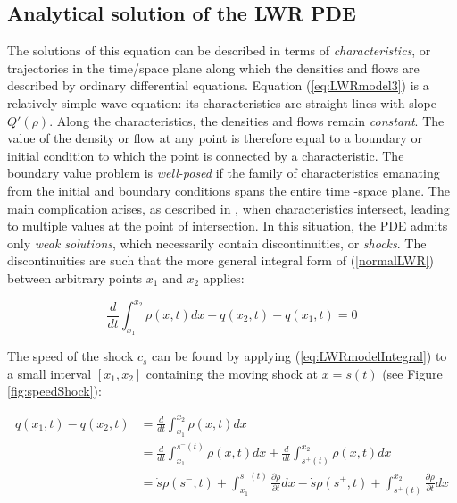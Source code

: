 \documentclass[letterpaper,10pt]{article}
\begin{document}
\subsection{Analytical solution of the LWR PDE}\label{characteristics}

The solutions of this equation can be described in terms of \textit{characteristics}, or trajectories in the time/space plane along which the densities and flows are described by ordinary differential equations. Equation (\ref{eq:LWRmodel3}) is a relatively simple wave equation: its characteristics are straight lines with slope $Q'(\rho)$. Along the characteristics, the densities and flows remain \textit{constant}. The value of the density or flow at any point is therefore equal to a boundary or initial condition to which the point is connected by a characteristic. The boundary value problem is \textit{well-posed} if the family of characteristics emanating from the initial and boundary conditions spans the entire time -space plane. The main complication arises, as described in \cite{Lighthill1955}, when characteristics intersect, leading to multiple values at the point of intersection. In this situation, the PDE admits only \textit{weak solutions}, which necessarily contain discontinuities, or \textit{shocks}. The discontinuities are such that the more general integral form of (\ref{normalLWR}) between arbitrary points $x_{1}$ and $x_{2}$ applies:

\begin{equation} \label{eq:LWRmodelIntegral}
\frac{d}{dt} \int_{x_{1}}^{x_{2}} \rho(x,t)dx + q(x_{2},t) - q(x_{1},t) = 0
\end{equation}

The speed of the shock $c_{s}$ can be found by applying (\ref{eq:LWRmodelIntegral}) to a small interval $[x_{1},x_{2}]$ containing the moving shock at $x=s(t)$ \cite{Whitham1999} (see Figure \ref{fig:speedShock}):

\begin{equation} \label{eq:csCalculus}
\begin{split}
q(x_{1},t) - q(x_{2},t) & = \frac{d}{dt}\int_{x_{1}}^{x_{2}} \rho(x,t)dx\\
& = \frac{d}{dt}\int_{x_{1}}^{s^{-}(t)}\rho(x,t)dx + \frac{d}{dt}\int_{s^{+}(t)}^{x_{2}}\rho(x,t)dx\\
& = \dot{s} \rho(s^{-},t) + \int_{x_{1}}^{s^{-}(t)}\frac{\partial \rho}{\partial t}dx - \dot{s} \rho(s^{+},t) + \int_{s^{+}(t)}^{x_{2}}\frac{\partial \rho}{\partial t}dx
\end{split}
\end{equation}
\end{document}
